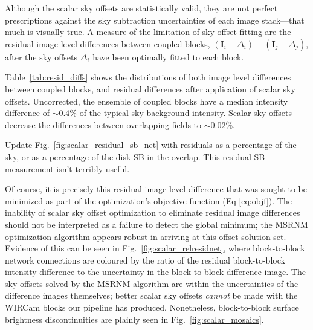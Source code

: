 \documentclass[iop]{emulateapj}
\newcommand{\vect}[1]{\boldsymbol{#1}} %
\newcommand{\sn}{\ensuremath{S/N}} %
\newcommand{\todo}[1]{\textcolor{RedOrange}{#1}} %
\newcommand{\Fig}[1]{Fig.~\ref{fig:#1}}  %
\begin{document}
Although the scalar sky offsets are statistically valid, they are not perfect prescriptions against the sky subtraction uncertainties of each image stack---that much is visually true.
A measure of the limitation of sky offset fitting are the residual image level differences between coupled blocks, $(\vect{I}_i - \Delta_i) - (\vect{I}_j - \Delta_j)$, after the sky offsets $\Delta_i$ have been optimally fitted to each block.

Table~\ref{tab:resid_diffs} shows the distributions of both image level differences between coupled blocks, and residual differences after application of scalar sky offsets.
Uncorrected, the ensemble of coupled blocks have a median intensity difference of $\sim 0.4\%$ of the typical sky background intensity.
Scalar sky offsets decrease the differences between overlapping fields to $\sim 0.02\%$.



\todo{Update \Fig{scalar_residual_sb_net} with residuals as a percentage of the sky, or as a percentage of the disk SB in the overlap. This residual SB measurement isn't terribly useful.}

Of course, it is precisely this residual image level difference that was sought to be minimized as part of the optimization's objective function (Eq \ref{eq:objf}).
The inability of scalar sky offset optimization to eliminate residual image differences should not be interpreted as a failure to detect the global minimum; the MSRNM optimization algorithm appears robust in arriving at this offset solution set.
Evidence of this can be seen in \Fig{scalar_relresidnet}, where block-to-block network connections are coloured by the ratio of the residual block-to-block intensity difference to the uncertainty in the block-to-block difference image.
The sky offsets solved by the MSRNM algorithm are within the uncertainties of the difference images themselves; better scalar sky offsets \emph{cannot} be made with the WIRCam blocks our pipeline has produced.
Nonetheless, block-to-block surface brightness discontinuities are plainly seen in \Fig{scalar_mosaics}.
\end{document}
